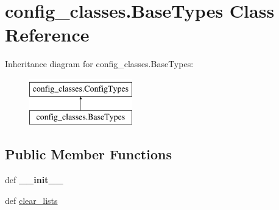 \hypertarget{classconfig__classes_1_1_base_types}{\section{config\-\_\-classes.\-Base\-Types Class Reference}
\label{classconfig__classes_1_1_base_types}
}
Inheritance diagram for config\-\_\-classes.\-Base\-Types\-:\begin{figure}[H]
\begin{center}
\leavevmode
\includegraphics[height=2.000000cm]{classconfig__classes_1_1_base_types}
\end{center}
\end{figure}
\subsection*{Public Member Functions}
\begin{DoxyCompactItemize}
\item 
\hypertarget{classconfig__classes_1_1_base_types_a880a41ddba00206b3fa7d6c1aeee2e31}{def {\bfseries \-\_\-\-\_\-init\-\_\-\-\_\-}}\label{classconfig__classes_1_1_base_types_a880a41ddba00206b3fa7d6c1aeee2e31}

\item 
def \hyperlink{classconfig__classes_1_1_base_types_aead92a42a0e8ffd6d19a7ef43adb402d}{clear\-\_\-lists}
\end{DoxyCompactItemize}

